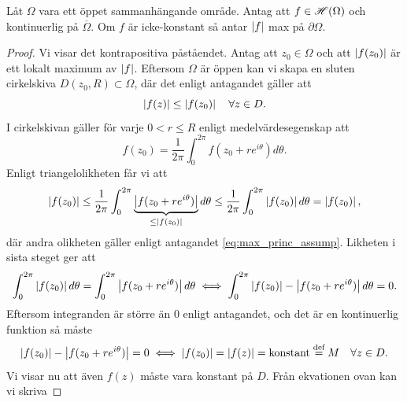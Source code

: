 \begin{theorem}[Maximumprincipen]
	\label{thm:maximumprincipen}
	Låt $\Omega$ vara ett öppet sammanhängande område. Antag att $f \in \mathscr{H}(\Omega)$ och kontinuerlig på $\overline{\Omega}$. Om $f$ är icke-konstant så antar $\left\lvert f \right\rvert$ max på $\partial \Omega$.
\end{theorem}
\begin{proof}
	Vi visar det kontrapositiva påståendet. Antag att $z_0 \in \Omega$ och att $\left\lvert f(z_0) \right\rvert$ är ett lokalt maximum av $\left\lvert f \right\rvert$. Eftersom $\Omega$ är öppen kan vi skapa en sluten cirkelskiva $D(z_0, R) \subset \Omega$, där det enligt antagandet gäller att
	\begin{equation}\label{eq:max_princ_assump}
		\left\lvert f(z) \right\rvert \le \left\lvert f(z_0) \right\rvert \quad \forall z \in D.
	\end{equation}
	I cirkelskivan gäller för varje $0 < r \le R$ enligt medelvärdesegenskap att
	\begin{equation*}
		f(z_0) = \frac{1}{2\pi} \int_0^{2\pi}{f(z_0 + re^{i\theta}) d\theta}.
	\end{equation*}
	Enligt triangelolikheten får vi att
	\begin{equation*}
		\left\lvert f(z_0) \right\rvert \le \frac{1}{2\pi} \int_0^{2\pi}{\underbrace{\left\lvert f(z_0+ re^{i\theta}) \right\rvert}_{\le \left\lvert f(z_0) \right\rvert} d\theta} \le \frac{1}{2\pi} \int_0^{2\pi}{\left\lvert f(z_0) \right\rvert d\theta} = \left\lvert f(z_0) \right\rvert,
	\end{equation*}
	där andra olikheten gäller enligt antagandet \eqref{eq:max_princ_assump}. Likheten i sista steget ger att
	\begin{equation*}
		\int_0^{2\pi}{\left\lvert f(z_0) \right\rvert d\theta}                                  =  \int_0^{2\pi}{\left\lvert f(z_0 + re^{i\theta}) \right\rvert d\theta}
		\iff \int_0^{2\pi}{\left\lvert f(z_0) \right\rvert-\left\lvert f(z_0 + re^{i\theta}) \right\rvert d\theta} = 0.
	\end{equation*}
	Eftersom integranden är större än 0 enligt antagandet, och det är en kontinuerlig funktion så måste
	\begin{equation*}
		\left\lvert f(z_0) \right\rvert - \left\lvert f(z_0 + re^{i\theta}) \right\rvert = 0
		\iff \left\lvert f(z_0) \right\rvert                          = \left\lvert f(z) \right\rvert = \text{konstant} \overset{\text{def}}{=} M \quad \forall z \in D.
	\end{equation*}
	Vi visar nu att även $f(z)$ måste vara konstant på $D$. Från ekvationen ovan kan vi skriva

\end{proof}
